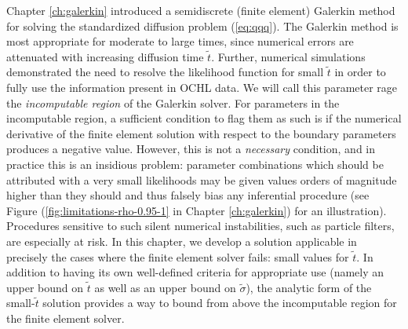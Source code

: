 \label{ch:small-time}

Chapter \ref{ch:galerkin} introduced a semidiscrete (finite element)
Galerkin method for solving the standardized diffusion problem
(\ref{eq:qqq}). The Galerkin method is most appropriate for moderate
to large times, since numerical errors are attenuated with increasing
diffusion time $\tilde{t}$. Further, numerical simulations
demonstrated the need to resolve the likelihood function for small
$\tilde{t}$ in order to fully use the information present in OCHL
data. We will call this parameter rage the \textit{incomputable
  region} of the Galerkin solver. For parameters in the incomputable
region, a sufficient condition to flag them as such is if the
numerical derivative of the finite element solution with respect to
the boundary parameters produces a negative value. However, this is
not a \textit{necessary} condition, and in practice this is an
insidious problem: parameter combinations which should be attributed
with a very small likelihoods may be given values orders of magnitude
higher than they should and thus falsely bias any inferential
procedure (see Figure (\ref{fig:limitations-rho-0.95-1} in Chapter
\ref{ch:galerkin}) for an illustration). Procedures sensitive to such
silent numerical instabilities, such as particle filters, are
especially at risk. In this chapter, we develop a solution applicable
in precisely the cases where the finite element solver fails: small
values for $\tilde{t}$. In addition to having its own well-defined
criteria for appropriate use (namely an upper bound on $\tilde{t}$ as
well as an upper bound on $\tilde{\sigma}$), the analytic form of the
small-$\tilde{t}$ solution provides a way to bound from above the
incomputable region for the finite element solver.


